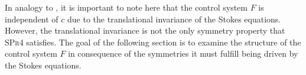  In analogy to \cite{Alouges2017}, it is important to note here that the control system $F$ is independent of $c$ due to the translational invariance of the Stokes equations. However, the translational invariance is not the only symmetry property that \textsc{SPr4} satisfies. The goal of the following section is to examine the structure of the control system $F$ in consequence of the symmetries it must fulfill being driven by the Stokes equations.





























